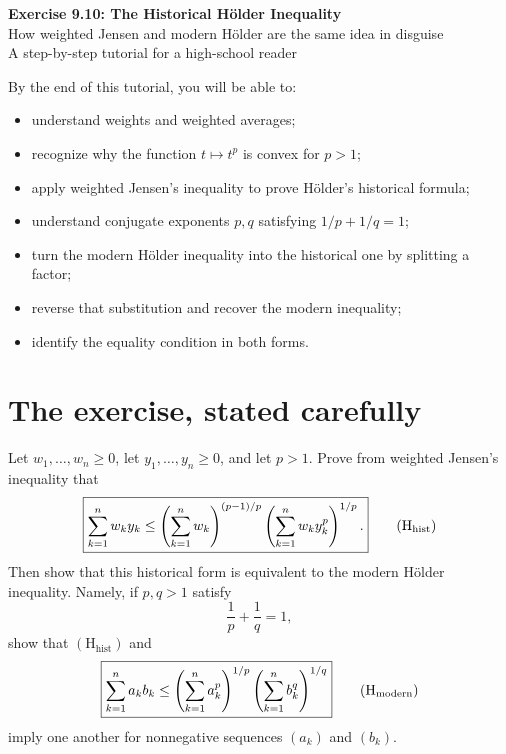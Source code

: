 \documentclass[11pt]{article}
\begin{document}
\begin{center}
  {\LARGE\bfseries Exercise 9.10: The Historical H\"older Inequality}\\[0.35em]
  {\Large How weighted Jensen and modern H\"older are the same idea in disguise}\\[0.7em]
  {\large A step-by-step tutorial for a high-school reader}
\end{center}

\vspace{0.4em}

\begin{ideaBox}
By the end of this tutorial, you will be able to:
\begin{itemize}
  \item understand weights and weighted averages;
  \item recognize why the function \(t\mapsto t^p\) is convex for \(p>1\);
  \item apply weighted Jensen's inequality to prove H\"older's historical formula;
  \item understand conjugate exponents \(p,q\) satisfying \(1/p+1/q=1\);
  \item turn the modern H\"older inequality into the historical one by splitting a factor;
  \item reverse that substitution and recover the modern inequality;
  \item identify the equality condition in both forms.
\end{itemize}
\end{ideaBox}

\tableofcontents

\section{The exercise, stated carefully}

\begin{problemBox}
Let \(w_1,\ldots,w_n\geq0\), let \(y_1,\ldots,y_n\geq0\), and let \(p>1\). Prove from weighted Jensen's inequality that
\[
 \boxed{\displaystyle
 \sum_{k=1}^{n}w_ky_k
 \leq
 \left(\sum_{k=1}^{n}w_k\right)^{(p-1)/p}
 \left(\sum_{k=1}^{n}w_ky_k^p\right)^{1/p}.}
 \tag{H$_{\mathrm{hist}}$}
\]
Then show that this historical form is equivalent to the modern H\"older inequality. Namely, if \(p,q>1\) satisfy
\[
 \frac1p+\frac1q=1,
\]
show that \((\mathrm{H}_{\mathrm{hist}})\) and
\[
 \boxed{\displaystyle
 \sum_{k=1}^{n}a_kb_k
 \leq
 \left(\sum_{k=1}^{n}a_k^p\right)^{1/p}
 \left(\sum_{k=1}^{n}b_k^q\right)^{1/q}}
 \tag{H$_{\mathrm{modern}}$}
\]
imply one another for nonnegative sequences \((a_k)\) and \((b_k)\).
\end{problemBox}
\end{document}
